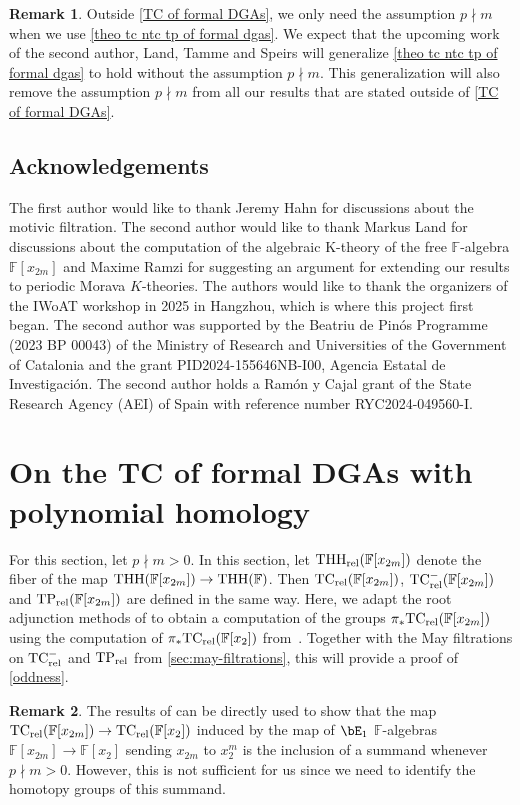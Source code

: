 \documentclass[english,10pt]{amsart}
\newcommand{\rel}{\textup{rel}}
\newcommand{\field}{\mathbb{F}}
\theoremstyle{definition}
\newtheorem{rema}{Remark}[section]
\numberwithin{equation}{section}
\DeclareMathOperator{\thh}{\ensuremath{\textup{THH}}}
\newcommand{\rntc}{\mathrm{TC}_{\rel}^{-}}
\newcommand{\rtp}{\mathrm{TP}_{\rel}}
\newcommand{\rtc}{\mathrm{TC}_{\rel}}
\newcommand{\rthh}{\mathrm{THH}_{\rel}}
\begin{document}
\begin{rema}\label{rema on p nmid m generalization}
Outside \autoref{TC of formal DGAs},  we only need the assumption $p \nmid m$ when we use \autoref{theo tc ntc tp of formal dgas}. We expect that the upcoming work of the second author, Land, Tamme and Speirs will generalize \autoref{theo tc ntc tp of formal dgas} to hold without the assumption $p \nmid m$. This generalization will also remove the assumption $p \nmid m$ from all our results that are stated outside of \autoref{TC of formal DGAs}. 
\end{rema}

\subsection{Acknowledgements}
The first author would like to thank Jeremy Hahn for discussions about the motivic filtration.  
The second author would like to thank Markus Land for discussions about the computation of the algebraic K-theory of the free $\field$-algebra $\field[x_{2m}]$ and Maxime Ramzi for suggesting an argument for extending our results to periodic Morava $K$-theories. The authors would like to thank the organizers of the IWoAT workshop in 2025 in Hangzhou, which is where this project first began. The second author was  supported by the Beatriu de Pin\'os Programme (2023 BP 00043) of the Ministry of Research and Universities of the Government of Catalonia and the grant  PID2024-155646NB-I00, Agencia Estatal de Investigaci\'on. The second author holds a  Ram\'on y Cajal grant of the State Research Agency (AEI) of Spain with reference number RYC2024-049560-I.



\section{On the TC of formal DGAs with polynomial homology}\label{TC of formal DGAs}
For this section, let $p \nmid m >0$.  In this section, let $\rthh(\field[x_{2m}])$ denote the fiber of the map $\thh(\field[x_{2m}]) \to \thh(\field)$. Then $\rtc(\field[x_{2m}])$, $\rntc(\field[x_{2m}])$ and $\rtp(\field[x_{2m}])$ are defined in the same way. 
Here, we adapt the root adjunction methods of \cite{ausoni2022adjroot} to obtain a computation of the groups $\pi_*\rtc(\field[x_{2m}])$ using the computation of  $\pi_*\rtc(\field[x_{2}])$ from~\cite{bayindir2020kthryofthh}. Together with the May filtrations on $\rntc$ and $\rtp$ from \autoref{sec:may-filtrations},  this will provide a proof of \autoref{oddness}. 
\begin{rema}
The results of \cite{ausoni2022adjroot}  can be directly used to show that the map $\rtc(\field[x_{2m}]) \to \rtc(\field[x_2])$ induced by the map of $\bE_1$ $\field$-algebras $\field[x_{2m}] \to \field[x_2]$ sending $x_{2m}$ to $x_2^m$ is the inclusion of a summand  whenever $p\nmid m>0$. However, this is not sufficient for us since we need to identify the homotopy groups of this summand.  
\end{rema}
\end{document}
